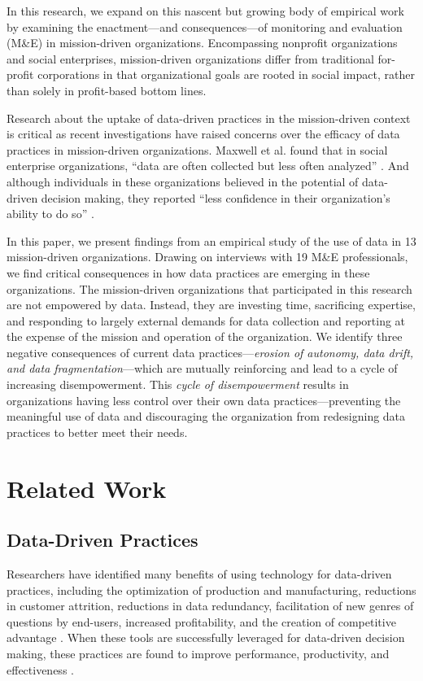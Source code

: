 In this research, we expand on this nascent but growing body of empirical work by examining the enactment---and consequences---of monitoring and evaluation (M\&E) in mission-driven organizations. Encompassing nonprofit organizations and social enterprises, mission-driven organizations differ from traditional for-profit corporations in that organizational goals are rooted in social impact, rather than solely in profit-based bottom lines.

Research about the uptake of data-driven practices in the mission-driven context is critical as recent investigations have raised concerns over the efficacy of data practices in mission-driven organizations. Maxwell et al. found that in social enterprise organizations, “data are often collected but less often analyzed” \citep{Maxwell2016Data}. And although individuals in these organizations believed in the potential of data-driven decision making, they reported “less confidence in their organization’s ability to do so” \citep{Maxwell2016Data}. 

In this paper, we present findings from an empirical study of the use of data in 13 mission-driven organizations. Drawing on interviews with 19 M\&E professionals, we find critical consequences in how data practices are emerging in these organizations. The mission-driven organizations that participated in this research are not empowered by data. Instead, they are investing time, sacrificing expertise, and responding to largely external demands for data collection and reporting at the expense of the mission and operation of the organization. We identify three negative consequences of current data practices---\textit{erosion of autonomy, data drift, and data fragmentation}---which are mutually reinforcing and lead to a cycle of increasing disempowerment. This \textit{cycle of disempowerment} results in organizations having less control over their own data practices—preventing the meaningful use of data and discouraging the organization from redesigning data practices to better meet their needs.

\section{Related Work}
\subsection{Data-Driven Practices}

Researchers have identified many benefits of using technology for data-driven practices, including the optimization of production and manufacturing, reductions in customer attrition, reductions in data redundancy, facilitation of new genres of questions by end-users, increased profitability, and the creation of competitive advantage \citep{Kohavi2002Trends,Piccoli2008Profit,Watson2007Current}. When these tools are successfully leveraged for data-driven decision making, these practices are found to improve performance, productivity, and effectiveness \citep{Brynjolfsson2011Strength,Lavalle2011Big,Leroux2010Does}.

